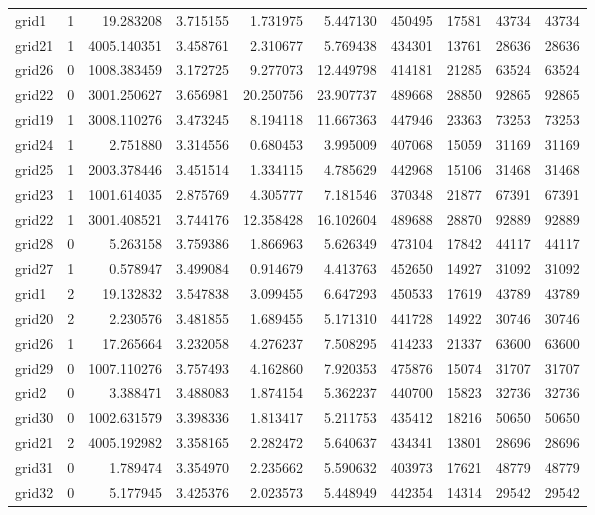 \begin{longtable}{|l|r|r|r|r|r|r|r|r|r|}
grid1 & 1 & 19.283208 & 3.715155 & 1.731975 & 5.447130 & 450495 & 17581 & 43734 & 43734 \\
grid21 & 1 & 4005.140351 & 3.458761 & 2.310677 & 5.769438 & 434301 & 13761 & 28636 & 28636 \\
grid26 & 0 & 1008.383459 & 3.172725 & 9.277073 & 12.449798 & 414181 & 21285 & 63524 & 63524 \\
grid22 & 0 & 3001.250627 & 3.656981 & 20.250756 & 23.907737 & 489668 & 28850 & 92865 & 92865 \\
grid19 & 1 & 3008.110276 & 3.473245 & 8.194118 & 11.667363 & 447946 & 23363 & 73253 & 73253 \\
grid24 & 1 & 2.751880 & 3.314556 & 0.680453 & 3.995009 & 407068 & 15059 & 31169 & 31169 \\
grid25 & 1 & 2003.378446 & 3.451514 & 1.334115 & 4.785629 & 442968 & 15106 & 31468 & 31468 \\
grid23 & 1 & 1001.614035 & 2.875769 & 4.305777 & 7.181546 & 370348 & 21877 & 67391 & 67391 \\
grid22 & 1 & 3001.408521 & 3.744176 & 12.358428 & 16.102604 & 489688 & 28870 & 92889 & 92889 \\
grid28 & 0 & 5.263158 & 3.759386 & 1.866963 & 5.626349 & 473104 & 17842 & 44117 & 44117 \\
grid27 & 1 & 0.578947 & 3.499084 & 0.914679 & 4.413763 & 452650 & 14927 & 31092 & 31092 \\
grid1 & 2 & 19.132832 & 3.547838 & 3.099455 & 6.647293 & 450533 & 17619 & 43789 & 43789 \\
grid20 & 2 & 2.230576 & 3.481855 & 1.689455 & 5.171310 & 441728 & 14922 & 30746 & 30746 \\
grid26 & 1 & 17.265664 & 3.232058 & 4.276237 & 7.508295 & 414233 & 21337 & 63600 & 63600 \\
grid29 & 0 & 1007.110276 & 3.757493 & 4.162860 & 7.920353 & 475876 & 15074 & 31707 & 31707 \\
grid2 & 0 & 3.388471 & 3.488083 & 1.874154 & 5.362237 & 440700 & 15823 & 32736 & 32736 \\
grid30 & 0 & 1002.631579 & 3.398336 & 1.813417 & 5.211753 & 435412 & 18216 & 50650 & 50650 \\
grid21 & 2 & 4005.192982 & 3.358165 & 2.282472 & 5.640637 & 434341 & 13801 & 28696 & 28696 \\
grid31 & 0 & 1.789474 & 3.354970 & 2.235662 & 5.590632 & 403973 & 17621 & 48779 & 48779 \\
grid32 & 0 & 5.177945 & 3.425376 & 2.023573 & 5.448949 & 442354 & 14314 & 29542 & 29542 \\

\end{longtable}
